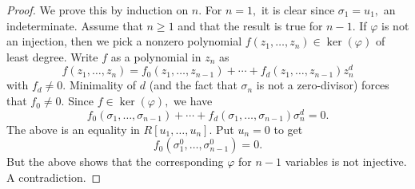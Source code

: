 \begin{proof}
    We prove this by induction on $n.$ For $n = 1,$ it is clear since $\sigma_1 = u_1,$ an indeterminate. Assume that $n \ge 1$ and that the result is true for $n - 1.$ If $\varphi$ is not an injection, then we pick a nonzero polynomial $f(z_1, \ldots, z_n) \in \ker(\varphi)$ of least degree. Write $f$ as a polynomial in $z_n$ as
    \begin{equation*} 
        f(z_1, \ldots, z_n) = f_0(z_1, \ldots, z_{n - 1}) + \cdots + f_d(z_1, \ldots, z_{n - 1})z_n^d
    \end{equation*}
    with $f_d \neq 0.$ Minimality of $d$ (and the fact that $\sigma_n$ is not a zero-divisor) forces that $f_0 \neq 0.$ Since $f \in \ker(\varphi),$ we have
    \begin{equation*} 
        f_0(\sigma_1, \ldots, \sigma_{n - 1}) + \cdots + f_d(\sigma_1, \ldots, \sigma_{n - 1})\sigma_n^d = 0.
    \end{equation*}
    The above is an equality in $R[u_1, \ldots, u_n].$ Put $u_n = 0$ to get
    \begin{equation*} 
        f_0(\sigma_1^0, \ldots, \sigma_{n - 1}^0) = 0.
    \end{equation*}
    But the above shows that the corresponding $\varphi$ for $n - 1$ variables is not injective. A contradiction.
\end{proof}

